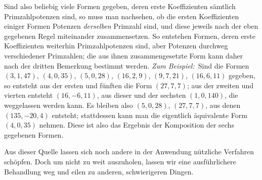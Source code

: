 Sind also beliebig viele Formen gegeben, deren erste Koeffizienten sämtlich Primzahlpotenzen sind, so muss man nachsehen, ob die ersten Koeffizienten einiger Formen Potenzen \textit{derselben} Primzahl sind, und diese jeweils nach der eben gegebenen Regel miteinander zusammensetzen. So entstehen Formen, deren erste Koeffizienten weiterhin Primzahlpotenzen sind, aber Potenzen durchweg verschiedener Primzahlen; die aus ihnen zusammengesetzte Form kann daher nach der dritten Bemerkung bestimmt werden. \textit{Zum Beispiel:}\ Sind die Formen $(3,1,47)$, $(4,0,35)$, $(5,0,28)$, $(16,2,9)$, $(9,7,21)$, $(16,6,11)$ gegeben, so entsteht aus der ersten und fünften die Form $(27,7,7)$; aus der zweiten und vierten entsteht $(16,-6,11)$, aus dieser und der sechsten $(1,0,140)$, die weggelassen werden kann. Es bleiben also $(5,0,28)$, $(27,7,7)$, aus denen $(135,-20,4)$ entsteht; stattdessen kann man die eigentlich äquivalente Form $(4,0,35)$ nehmen. Diese ist also das Ergebnis der Komposition der sechs gegebenen Formen.

Aus dieser Quelle lassen sich noch andere in der Anwendung nützliche Verfahren schöpfen. Doch um nicht zu weit auszuholen, lassen wir eine ausführlichere Behandlung weg und eilen zu anderen, schwierigeren Dingen.
